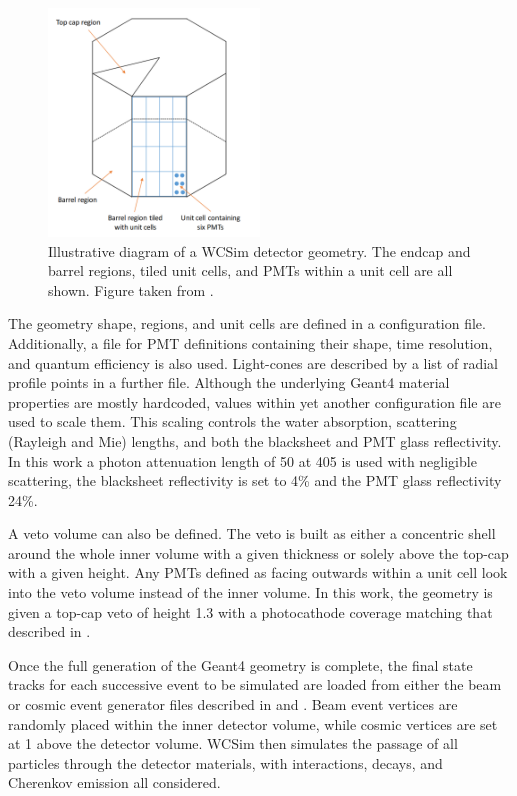 \begin{figure} %
    \includegraphics[width=0.5\textwidth]{diagrams/4-chips/sim_geom.pdf}
    \caption[Illustrative diagram of a WCSim detector geometry]
    {Illustrative diagram of a WCSim detector geometry. The endcap and barrel regions, tiled unit
        cells, and PMTs within a unit cell are all shown. Figure taken from
        .}
    \label{fig:sim_geom}
\end{figure}

The geometry shape, regions, and unit cells are defined in a configuration file. Additionally, a
file for PMT definitions containing their shape, time resolution, and quantum efficiency is also
used. Light-cones are described by a list of radial profile points in a further file. Although the
underlying Geant4 material properties are mostly hardcoded, values within yet another
configuration file are used to scale them. This scaling controls the water absorption, scattering
(Rayleigh and Mie) lengths, and both the blacksheet and PMT glass reflectivity. In this work a
photon attenuation length of \SI{50}{} at \SI{405}{} is used with negligible
scattering, the blacksheet reflectivity is set to 4\% and the PMT glass reflectivity 24\%.

A veto volume can also be defined. The veto is built as either a concentric shell around the whole
inner volume with a given thickness or solely above the top-cap with a given height. Any PMTs
defined as facing outwards within a unit cell look into the veto volume instead of the inner
volume. In this work, the \chipsfive geometry is given a top-cap veto of height \SI{1.3}{}
with a photocathode coverage matching that described in
.

Once the full generation of the Geant4 geometry is complete, the final state tracks for each
successive event to be simulated are loaded from either the beam or cosmic event generator files
described in  and
. Beam event vertices are randomly placed within the
inner detector volume, while cosmic vertices are set at \SI{1}{} above the detector
volume. WCSim then simulates the passage of all particles through the detector materials, with
interactions, decays, and Cherenkov emission all considered.

